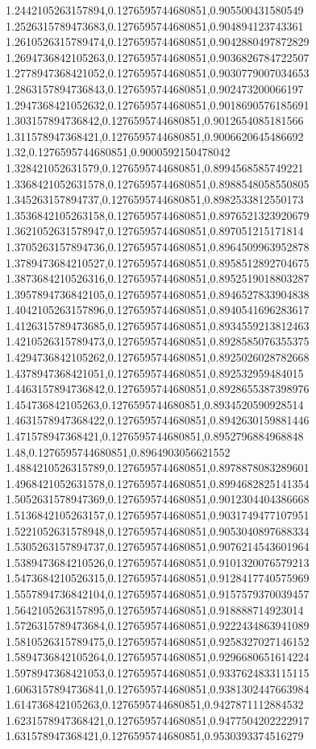 1.2442105263157894,0.1276595744680851,0.905500431580549
1.2526315789473683,0.1276595744680851,0.904894123743361
1.2610526315789474,0.1276595744680851,0.9042880497872829
1.2694736842105263,0.1276595744680851,0.9036826784722507
1.2778947368421052,0.1276595744680851,0.9030779007034653
1.2863157894736843,0.1276595744680851,0.902473200066197
1.2947368421052632,0.1276595744680851,0.9018690576185691
1.303157894736842,0.1276595744680851,0.9012654085181566
1.311578947368421,0.1276595744680851,0.9006620645486692
1.32,0.1276595744680851,0.9000592150478042
1.328421052631579,0.1276595744680851,0.8994568585749221
1.3368421052631578,0.1276595744680851,0.8988548058550805
1.345263157894737,0.1276595744680851,0.8982533812550173
1.3536842105263158,0.1276595744680851,0.8976521323920679
1.3621052631578947,0.1276595744680851,0.897051215171814
1.3705263157894736,0.1276595744680851,0.8964509963952878
1.3789473684210527,0.1276595744680851,0.8958512892704675
1.3873684210526316,0.1276595744680851,0.8952519018803287
1.3957894736842105,0.1276595744680851,0.8946527833904838
1.4042105263157896,0.1276595744680851,0.8940541696283617
1.4126315789473685,0.1276595744680851,0.8934559213812463
1.4210526315789473,0.1276595744680851,0.8928585076355375
1.4294736842105262,0.1276595744680851,0.8925026028782668
1.4378947368421051,0.1276595744680851,0.892532959484015
1.4463157894736842,0.1276595744680851,0.8928655387398976
1.454736842105263,0.1276595744680851,0.8934520590928514
1.4631578947368422,0.1276595744680851,0.8942630159881446
1.471578947368421,0.1276595744680851,0.8952796884968848
1.48,0.1276595744680851,0.8964903056621552
1.4884210526315789,0.1276595744680851,0.8978878083289601
1.4968421052631578,0.1276595744680851,0.8994682825141354
1.5052631578947369,0.1276595744680851,0.9012304404386668
1.5136842105263157,0.1276595744680851,0.9031749477107951
1.5221052631578948,0.1276595744680851,0.9053040897688334
1.5305263157894737,0.1276595744680851,0.9076214543601964
1.5389473684210526,0.1276595744680851,0.9101320076579213
1.5473684210526315,0.1276595744680851,0.9128417740575969
1.5557894736842104,0.1276595744680851,0.9157579370039457
1.5642105263157895,0.1276595744680851,0.918888714923014
1.5726315789473684,0.1276595744680851,0.9222434863941089
1.5810526315789475,0.1276595744680851,0.9258327027146152
1.5894736842105264,0.1276595744680851,0.9296680651614224
1.5978947368421053,0.1276595744680851,0.9337624833115115
1.6063157894736841,0.1276595744680851,0.9381302447663984
1.614736842105263,0.1276595744680851,0.9427871112884532
1.6231578947368421,0.1276595744680851,0.9477504202222917
1.631578947368421,0.1276595744680851,0.9530393374516279
